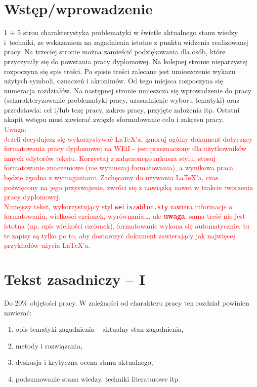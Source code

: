 \documentclass[12pt,twoside]{article}
\begin{document}
\section{Wstęp/wprowadzenie}
1 $\div$ 5 stron charakterystyka problematyki w świetle aktualnego stanu wiedzy i~techniki, ze wskazaniem na zagadnienia istotne z punktu widzenia realizowanej pracy.
Na trzeciej stronie można zamieścić podziękowania dla osób, które przyczyniły się do powstania pracy dyplomowej. Na kolejnej stronie nieparzystej rozpoczyna się spis treści. Po spisie treści zalecane jest umieszczenie wykazu użytych symboli, oznaczeń i akronimów. Od tego miejsca rozpoczyna się numeracja rozdziałów. Na następnej stronie umieszcza się wprowadzenie do pracy (scharakteryzowanie problematyki pracy, uzasadnienie wyboru tematyki) oraz przedstawia: cel i/lub tezę pracy, zakres pracy, przyjęte założenia itp.
Ostatni akapit wstępu musi zawierać zwięzłe sformułowanie celu i zakresu pracy. 
\\
\textcolor{red}{
Uwaga: \\
Jeżeli decydujesz się wykorzystywać \LaTeX'a, ignoruj ogólny dokument dotyczący formatowania pracy dyplomowej na WEiI - jest przeznaczony dla użytkowników innych edytorów tekstu. Korzystaj z załączonego arkusza stylu, stosuj formatowanie znaczeniowe (nie wymuszaj formatowania), a wynikowa praca będzie zgodna z wymaganiami. Zachęcamy do używania \LaTeX'a, czas poświęcony na jego przyswojenie, zwróci się z nawiązką nawet w trakcie tworzenia pracy dyplomowej. \\
Niniejszy tekst, wykorzystujący  styl \texttt{weiiszablon.sty} zawiera informacje o formatowaniu, wielkości czcionek, wyrównania\ldots, ale \textbf{uwaga}, sama treść nie jest istotna (np. opis wielkości czcionek), 
formatowanie wykona się automatycznie, tu te zapisy są tylko po to, aby dostarczyć dokument zawierający jak najwięcej przykładów użycia \LaTeX'a.
}

\clearpage

\section{Tekst zasadniczy -- I}

Do 20\% objętości pracy. W zależności od charakteru pracy ten rozdział powinien zawierać:
\begin{enumerate}[label=\alph*), leftmargin=1.25cm]
	\item opis tematyki zagadnienia -- aktualny stan zagadnienia,
	\item metody i rozwiązania,
	\item dyskusja i krytyczna ocena stanu aktualnego,
	\item podsumowanie stanu wiedzy, techniki literaturowe itp.
\end{enumerate}
\end{document}
